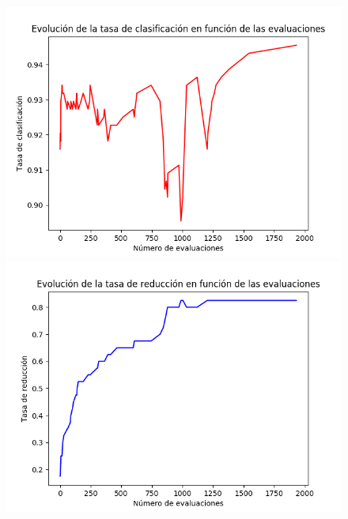 \documentclass[11pt,a4paper]{article}
\begin{document}
\begin{figure}[H]
\centering
\begin{minipage}{.5\textwidth}
	\centering
	\includegraphics[scale=0.43]{img/acc_texture.png}
\end{minipage}%
\begin{minipage}{.5\textwidth}
	\centering
	\includegraphics[scale=0.43]{img/red_texture.png}
\end{minipage}
\end{figure}
\end{document}
